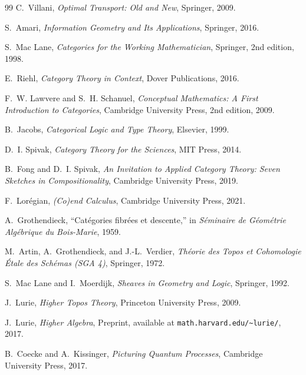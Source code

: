 \documentclass[11pt,a4paper]{article}
\theoremstyle{definition}
\theoremstyle{remark}
\begin{document}
\begin{thebibliography}{99}
C.~Villani,
\newblock \emph{Optimal Transport: Old and New},
\newblock Springer, 2009.

S.~Amari,
\newblock \emph{Information Geometry and Its Applications},
\newblock Springer, 2016.

S.~Mac Lane,
\newblock \emph{Categories for the Working Mathematician},
\newblock Springer, 2nd edition, 1998.

E.~Riehl,
\newblock \emph{Category Theory in Context},
\newblock Dover Publications, 2016.

F.~W. Lawvere and S.~H. Schanuel,
\newblock \emph{Conceptual Mathematics: A First Introduction to Categories},
\newblock Cambridge University Press, 2nd edition, 2009.

B.~Jacobs,
\newblock \emph{Categorical Logic and Type Theory},
\newblock Elsevier, 1999.

D.~I. Spivak,
\newblock \emph{Category Theory for the Sciences},
\newblock MIT Press, 2014.

B.~Fong and D.~I. Spivak,
\newblock \emph{An Invitation to Applied Category Theory: Seven Sketches in Compositionality},
\newblock Cambridge University Press, 2019.

F.~Lor\'{e}gian,
\newblock \emph{(Co)end Calculus},
\newblock Cambridge University Press, 2021.

A.~Grothendieck,
\newblock ``Cat\'{e}gories fibr\'{e}es et descente,''
\newblock in \emph{S\'{e}minaire de G\'{e}om\'{e}trie Alg\'{e}brique du Bois-Marie}, 1959.

M.~Artin, A.~Grothendieck, and J.-L.~Verdier,
\newblock \emph{Th\'{e}orie des Topos et Cohomologie \'{E}tale des Sch\'{e}mas (SGA 4)},
\newblock Springer, 1972.

S.~Mac Lane and I.~Moerdijk,
\newblock \emph{Sheaves in Geometry and Logic},
\newblock Springer, 1992.

J.~Lurie,
\newblock \emph{Higher Topos Theory},
\newblock Princeton University Press, 2009.

J.~Lurie,
\newblock \emph{Higher Algebra},
\newblock Preprint, available at \texttt{math.harvard.edu/\textasciitilde lurie/}, 2017.

B.~Coecke and A.~Kissinger,
\newblock \emph{Picturing Quantum Processes},
\newblock Cambridge University Press, 2017.


\end{thebibliography}
\end{document}
